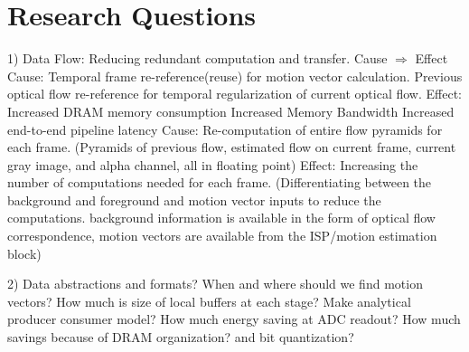 \chapter{Research Questions}


1)  Data Flow: Reducing redundant computation and transfer.\newline
	Cause $\Rightarrow$ Effect  \newline
	Cause:\newline
	Temporal frame re-reference(reuse) for motion vector calculation.\newline
	Previous optical flow re-reference for temporal regularization of current optical flow.\newline
	Effect: \newline
	Increased DRAM memory consumption \newline
	Increased Memory Bandwidth \newline
	Increased end-to-end pipeline latency \newline
	Cause: \newline
	Re-computation of entire flow pyramids for each frame. (Pyramids of previous flow, estimated flow on current frame, current gray image, and alpha channel, all in floating point)\newline
	Effect:\newline
	Increasing the number of computations needed for each frame. \newline
	(Differentiating between the background and foreground and motion vector inputs to reduce the computations. background information is available in the form of optical flow correspondence, motion vectors are available from the ISP/motion estimation block)\newline
	
2)  Data abstractions and formats?
	When and where should we find motion vectors?
	How much is size of local buffers at each stage? Make analytical producer consumer model?
	How much energy saving at ADC readout?
	How much savings because of DRAM organization? and bit quantization?
	
